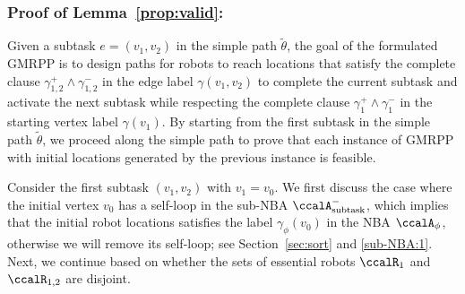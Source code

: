 \documentclass[Afour,sageh,times]{sagej}
\newcounter{mycounter}
\newcommand{\auto}[1]{\ccalA_{\textup{#1}}}
\newcommand{\autop}{\ccalA_{\phi}}
\begin{document}
{%




\subsubsection{Proof of Lemma~\ref{prop:valid}:}\label{app:valid}
Given a subtask $e = (v_1, v_2)$ in the simple path $\tilde{\theta}$, the goal of the formulated  GMRPP is to design paths for robots to reach locations that satisfy the complete clause $\gamma_{1,2}^+ \wedge \gamma_{1,2}^-$ in the edge label $\gamma(v_1, v_2)$ to complete the current subtask and activate the next subtask while respecting the complete clause $\gamma_1^+ \wedge \gamma_1^-$ in the starting vertex label $\gamma(v_1)$. By starting from the first subtask in the simple path $\tilde{\theta}$, we proceed along the simple path to prove that each instance of GMRPP with initial locations generated by the previous instance is feasible.


Consider the first subtask $(v_1, v_2)$ with $v_1 = v_0$. We first discuss the case where  the initial vertex $v_0$ has a self-loop in the sub-NBA $\auto{subtask}^-$, which implies that the initial robot locations satisfies the label $\gamma_{\phi}(v_0)$ in the NBA $\autop$, otherwise we will remove its self-loop; see Section~\ref{sec:sort} and \ref{sub-NBA:1}. Next, we continue based on whether the sets of essential robots $\ccalR_1$ and $\ccalR_{1,2}$ are disjoint.
}
\end{document}
